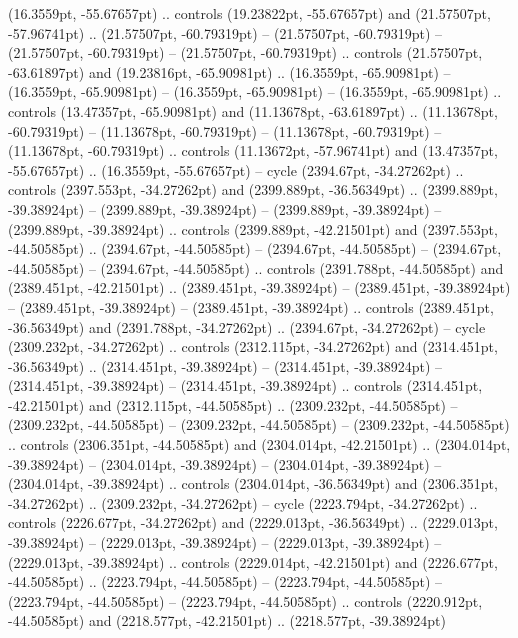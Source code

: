 (16.3559pt, -55.67657pt) .. controls (19.23822pt, -55.67657pt) and (21.57507pt, -57.96741pt) .. (21.57507pt, -60.79319pt)
 -- (21.57507pt, -60.79319pt)
 -- (21.57507pt, -60.79319pt)
 -- (21.57507pt, -60.79319pt) .. controls (21.57507pt, -63.61897pt) and (19.23816pt, -65.90981pt) .. (16.3559pt, -65.90981pt)
 -- (16.3559pt, -65.90981pt)
 -- (16.3559pt, -65.90981pt)
 -- (16.3559pt, -65.90981pt) .. controls (13.47357pt, -65.90981pt) and (11.13678pt, -63.61897pt) .. (11.13678pt, -60.79319pt)
 -- (11.13678pt, -60.79319pt)
 -- (11.13678pt, -60.79319pt)
 -- (11.13678pt, -60.79319pt) .. controls (11.13672pt, -57.96741pt) and (13.47357pt, -55.67657pt) .. (16.3559pt, -55.67657pt) -- cycle
(2394.67pt, -34.27262pt) .. controls (2397.553pt, -34.27262pt) and (2399.889pt, -36.56349pt) .. (2399.889pt, -39.38924pt)
 -- (2399.889pt, -39.38924pt)
 -- (2399.889pt, -39.38924pt)
 -- (2399.889pt, -39.38924pt) .. controls (2399.889pt, -42.21501pt) and (2397.553pt, -44.50585pt) .. (2394.67pt, -44.50585pt)
 -- (2394.67pt, -44.50585pt)
 -- (2394.67pt, -44.50585pt)
 -- (2394.67pt, -44.50585pt) .. controls (2391.788pt, -44.50585pt) and (2389.451pt, -42.21501pt) .. (2389.451pt, -39.38924pt)
 -- (2389.451pt, -39.38924pt)
 -- (2389.451pt, -39.38924pt)
 -- (2389.451pt, -39.38924pt) .. controls (2389.451pt, -36.56349pt) and (2391.788pt, -34.27262pt) .. (2394.67pt, -34.27262pt) -- cycle
(2309.232pt, -34.27262pt) .. controls (2312.115pt, -34.27262pt) and (2314.451pt, -36.56349pt) .. (2314.451pt, -39.38924pt)
 -- (2314.451pt, -39.38924pt)
 -- (2314.451pt, -39.38924pt)
 -- (2314.451pt, -39.38924pt) .. controls (2314.451pt, -42.21501pt) and (2312.115pt, -44.50585pt) .. (2309.232pt, -44.50585pt)
 -- (2309.232pt, -44.50585pt)
 -- (2309.232pt, -44.50585pt)
 -- (2309.232pt, -44.50585pt) .. controls (2306.351pt, -44.50585pt) and (2304.014pt, -42.21501pt) .. (2304.014pt, -39.38924pt)
 -- (2304.014pt, -39.38924pt)
 -- (2304.014pt, -39.38924pt)
 -- (2304.014pt, -39.38924pt) .. controls (2304.014pt, -36.56349pt) and (2306.351pt, -34.27262pt) .. (2309.232pt, -34.27262pt) -- cycle
(2223.794pt, -34.27262pt) .. controls (2226.677pt, -34.27262pt) and (2229.013pt, -36.56349pt) .. (2229.013pt, -39.38924pt)
 -- (2229.013pt, -39.38924pt)
 -- (2229.013pt, -39.38924pt)
 -- (2229.013pt, -39.38924pt) .. controls (2229.014pt, -42.21501pt) and (2226.677pt, -44.50585pt) .. (2223.794pt, -44.50585pt)
 -- (2223.794pt, -44.50585pt)
 -- (2223.794pt, -44.50585pt)
 -- (2223.794pt, -44.50585pt) .. controls (2220.912pt, -44.50585pt) and (2218.577pt, -42.21501pt) .. (2218.577pt, -39.38924pt)
